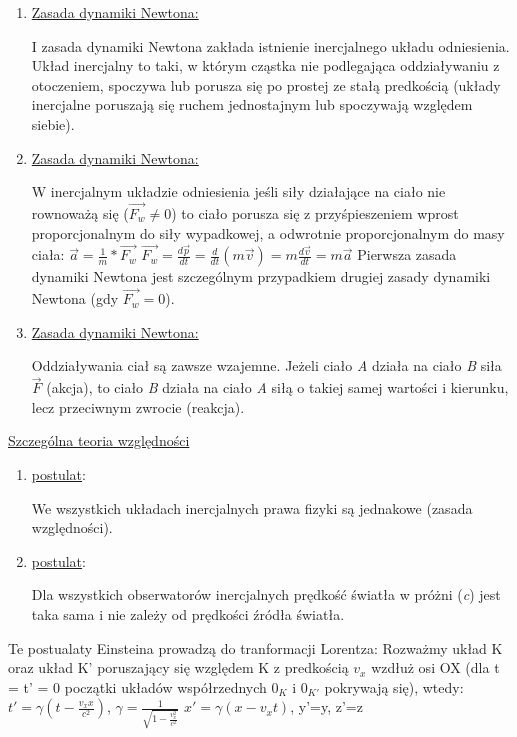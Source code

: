 
\begin{enumerate}[1]
\item \underline{Zasada dynamiki Newtona:}

I zasada dynamiki Newtona zakłada istnienie inercjalnego układu odniesienia. Układ inercjalny to taki, w którym cząstka nie podlegająca oddziaływaniu z otoczeniem, spoczywa lub porusza się po prostej ze stałą predkością (układy inercjalne poruszają się ruchem jednostajnym lub spoczywają względem siebie).

\item \underline{Zasada dynamiki Newtona:}
	
W inercjalnym układzie odniesienia jeśli siły działające na ciało nie rownoważą się ($ \vec{F_w} \neq 0 $) to ciało porusza się z przyśpieszeniem wprost proporcjonalnym do siły wypadkowej, a odwrotnie proporcjonalnym do masy ciała:\newline
$ \vec{a} = \frac{1}{m}*\vec{F_w} $\newline
$ \vec{F_w} = \frac{d\vec{p}}{dt} = \frac{d}{dt}(m\vec{v}) = m\frac{d\vec{v}}{dt} = m\vec{a} $\newline
Pierwsza zasada dynamiki Newtona jest szczególnym przypadkiem drugiej zasady dynamiki Newtona (gdy $ \vec{F_w} = 0 $).

\item \underline{Zasada dynamiki Newtona:}

Oddziaływania ciał są zawsze wzajemne. Jeżeli ciało \textit{A} działa na ciało \textit{B} siła $\vec{F}$ (akcja), to ciało \textit{B} działa na ciało \textit{A} siłą o takiej samej wartości i kierunku, lecz przeciwnym zwrocie (reakcja).
	
\end{enumerate}

\underline{Szczególna teoria względności}

\begin{enumerate}[1]
	\item \underline{postulat}:
	
We wszystkich układach inercjalnych prawa fizyki są jednakowe (zasada względności).

	\item \underline{postulat}:
	
Dla wszystkich obserwatorów inercjalnych prędkość światła w próżni (\textit{c}) jest taka sama i nie zależy od prędkości źródła światła.

\end{enumerate}

Te postualaty Einsteina prowadzą do tranformacji Lorentza:\newline
Rozważmy układ K oraz układ K' poruszający się względem K z predkością $ v_x $ wzdłuż osi OX (dla t = t' = 0 początki układów współrzednych $ 0_K $ i $ 0_{K'} $ pokrywają się), wtedy:\newline
$ t' = \gamma(\textit{t} - \frac{v_xx}{c^2}) $, $\gamma = \frac{1}{\sqrt{1-\frac{v_x^2}{c^2}}}$\newline
$ x'=\gamma(x - v_xt) $, y'=y, z'=z

